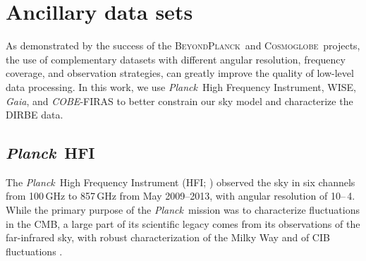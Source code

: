 \documentclass{aa}
\def\Planck{\textit{Planck}}
\def\COBE{\textit{COBE}}
\def\GAIA{\textit{Gaia}}
\def\WISE{WISE}
\newcommand{\bp}{\textsc{BeyondPlanck}}
\newcommand{\cosmoglobe}{\textsc{Cosmoglobe}}
\begin{document}






\section{Ancillary data sets}
\label{sec:ancillary}

As demonstrated by the success of the \bp\ and \cosmoglobe\ projects, the use of complementary datasets with different angular resolution, frequency coverage, and observation strategies, can greatly improve the quality of low-level data processing. In this work, we use \Planck\ High Frequency Instrument, \WISE, \GAIA, and \COBE-FIRAS to better constrain our sky model and characterize the DIRBE data.


\subsection{\Planck\ HFI}


The \Planck\ High Frequency Instrument (HFI; \citealt{planck2016-l03}) observed the sky in six channels from 100\,GHz to 857\,GHz from May 2009--2013, with angular resolution of 10\arcm--\,4\arcm. While the primary purpose of the \Planck\ mission was to characterize fluctuations in the CMB, a large part of its scientific legacy comes from its observations of the far-infrared sky, with robust characterization of the Milky Way \citep{planck2013-XVII,planck2014-a12,planck2016-l03} and of CIB fluctuations \citep{planck2014-a12,planck2013-XVII,lenz2019,mccarthy:2024}.
\end{document}
